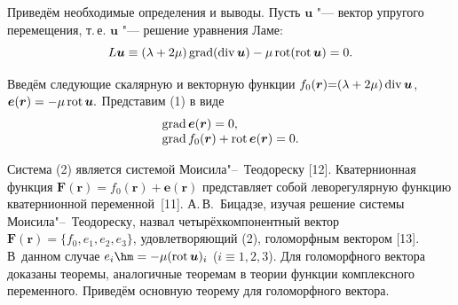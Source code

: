Приведём необходимые определения и выводы. Пусть $\boldsymbol{u}$ "--- вектор упругого перемещения, т.\,е. $\boldsymbol{u}$ "--- решение уравнения Ламе:
\begin{equation}
L\boldsymbol{u}\equiv (\lambda+2\mu)\mathop{\rm grad}(\mathop{\rm div}  \boldsymbol{u})-
\mu \mathop{\rm rot }(\mathop{\rm rot }\boldsymbol{u})=0.
\end{equation}

Введём следующие скалярную и векторную функции $f_{0}(\boldsymbol{r}){=}(\lambda+2\mu)\mathop{\rm div} \boldsymbol{u}$,
$\boldsymbol{e}(\boldsymbol{r})=-\mu \mathop{\rm rot } \boldsymbol{u}.$
Представим (1) в виде
\begin{equation}
\begin{array}{l}
\mathop{\rm grad} \boldsymbol{e}(\boldsymbol{r})=0, \\ 
\mathop{\rm grad} f_{0}(\boldsymbol{r})+ \mathop{\rm rot }\boldsymbol{e}(\boldsymbol{r})=0.
\end{array}
\end{equation}

Система (2) является системой Моисила"--~Теодореску [12].
 Кватернионная функция $\boldsymbol{F}(\boldsymbol{r})=f_{0}(\boldsymbol{r})+\boldsymbol{e}(\boldsymbol{r})$  
 представляет собой леворегулярную функцию  кватернионной переменной~[11]. 
А.\,В.~Бицадзе, изучая решение системы  Моисила"--~Теодореску, назвал четырёхкомпонентный вектор 
$\boldsymbol{F}(\boldsymbol{r})=\{ f_{0}, e_{1}, e_{2}, e_{3}\}$, удовлетворяющий (2), голоморфным вектором [13]. 
В~данном случае  $e_{i}\hm={-\mu( \mathop{\rm rot }\boldsymbol{u})_i}$  ($i\equiv 1, 2, 3$).
Для голоморфного вектора доказаны теоремы, аналогичные теоремам в теории функции комплексного переменного. 
Приведём основную теорему для голоморфного вектора.

